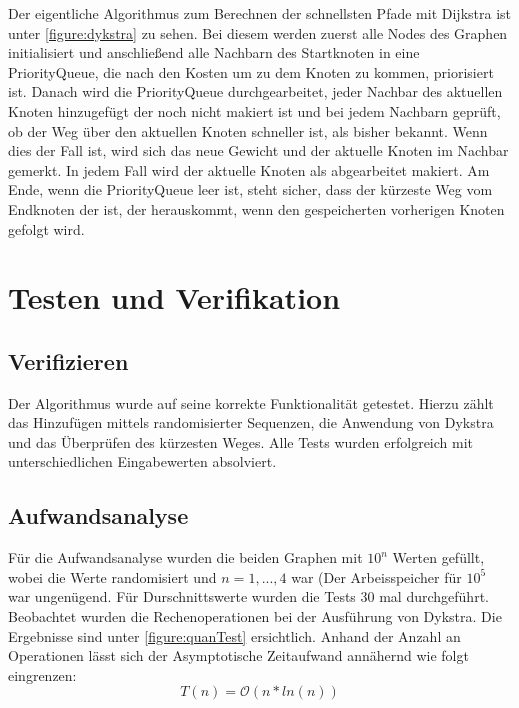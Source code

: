 \documentclass[11pt]{scrartcl}
\begin{document}
		Der eigentliche Algorithmus zum Berechnen der schnellsten Pfade mit Dijkstra ist unter \ref{figure:dykstra} zu sehen.
		Bei diesem werden zuerst alle Nodes des Graphen initialisiert und anschließend alle Nachbarn des Startknoten in eine PriorityQueue, die nach den Kosten um zu dem Knoten zu kommen, priorisiert ist. Danach wird die PriorityQueue durchgearbeitet, jeder Nachbar des aktuellen Knoten hinzugefügt der noch nicht makiert ist und bei jedem Nachbarn geprüft, ob der Weg über den aktuellen Knoten schneller ist, als bisher bekannt. Wenn dies der Fall ist, wird sich das neue Gewicht und der aktuelle Knoten im Nachbar gemerkt. In jedem Fall wird der aktuelle Knoten als abgearbeitet makiert. Am Ende, wenn die PriorityQueue leer ist, steht sicher, dass der kürzeste Weg vom Endknoten der ist, der herauskommt, wenn den gespeicherten vorherigen Knoten gefolgt wird.

		
\section{Testen und Verifikation}
\label{sec:vertests}

	\subsection{Verifizieren}
		\label{sec:veri}
		
		Der Algorithmus wurde auf seine korrekte Funktionalität getestet.
		Hierzu zählt das Hinzufügen mittels randomisierter Sequenzen, die Anwendung von Dykstra und das Überprüfen des kürzesten Weges.
		Alle Tests wurden erfolgreich mit unterschiedlichen Eingabewerten absolviert.
	
	\subsection{Aufwandsanalyse}
		\label{sec:aufwand}
		
		Für die Aufwandsanalyse wurden die beiden Graphen mit $10^n$ Werten gefüllt, wobei die Werte randomisiert und $n=1,...,4$ war (Der Arbeisspeicher für $10^5$ war ungenügend. Für Durschnittswerte wurden die Tests 30 mal durchgeführt.
		Beobachtet wurden die Rechenoperationen bei der Ausführung von Dykstra. Die Ergebnisse sind unter \ref{figure:quanTest} ersichtlich. Anhand der Anzahl an Operationen lässt sich der Asymptotische Zeitaufwand annähernd wie folgt eingrenzen:
		\begin{equation*}
		T(n) = \mathcal{O}(n*ln(n))
		\end{equation*}
\end{document}
